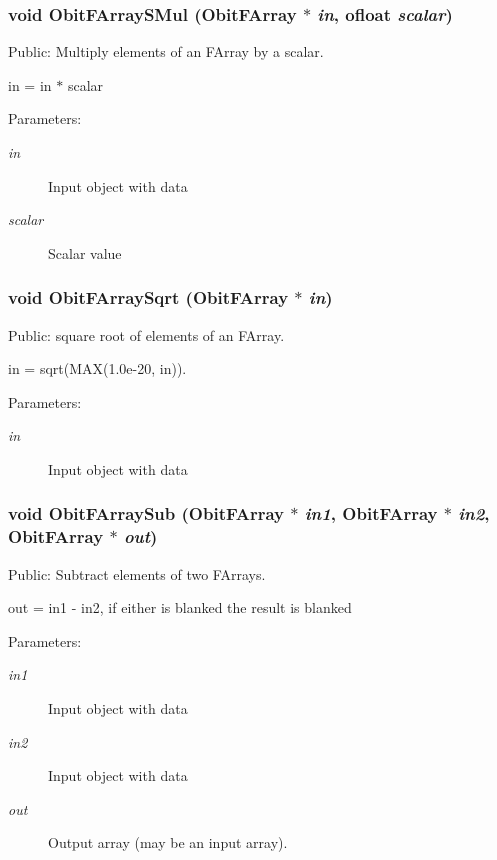 \subsubsection{\setlength{\rightskip}{0pt plus 5cm}void Obit\-FArray\-SMul ({\bf Obit\-FArray} $\ast$ {\em in}, {\bf ofloat} {\em scalar})}\label{ObitFArray_8h_a84}


Public: Multiply elements of an FArray by a scalar. 

in = in $\ast$ scalar \begin{Desc}
\item[Parameters:]
\begin{description}
\item[{\em in}]Input object with data \item[{\em scalar}]Scalar value \end{description}
\end{Desc}
\subsubsection{\setlength{\rightskip}{0pt plus 5cm}void Obit\-FArray\-Sqrt ({\bf Obit\-FArray} $\ast$ {\em in})}\label{ObitFArray_8h_a80}


Public: square root of elements of an FArray. 

in = sqrt(MAX(1.0e-20, in)). \begin{Desc}
\item[Parameters:]
\begin{description}
\item[{\em in}]Input object with data \end{description}
\end{Desc}
\subsubsection{\setlength{\rightskip}{0pt plus 5cm}void Obit\-FArray\-Sub ({\bf Obit\-FArray} $\ast$ {\em in1}, {\bf Obit\-FArray} $\ast$ {\em in2}, {\bf Obit\-FArray} $\ast$ {\em out})}\label{ObitFArray_8h_a94}


Public: Subtract elements of two FArrays. 

out = in1 - in2, if either is blanked the result is blanked \begin{Desc}
\item[Parameters:]
\begin{description}
\item[{\em in1}]Input object with data \item[{\em in2}]Input object with data \item[{\em out}]Output array (may be an input array). \end{description}
\end{Desc}
